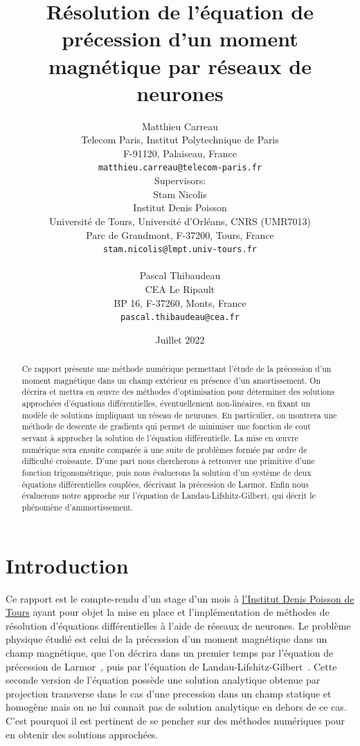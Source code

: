 \documentclass[12pt]{report}
\title{Résolution de l'équation de précession d'un moment magnétique par réseaux de neurones}
\author{
  Matthieu Carreau\\
  Telecom Paris, Institut Polytechnique de Paris\\
  F-91120, Palaiseau, France\\
  \texttt{matthieu.carreau@telecom-paris.fr} \\
  [1em] Supervisors: \\
  Stam Nicolis\\
  Institut Denis Poisson\\
  Université de Tours, Université d'Orléans, CNRS (UMR7013)\\
  Parc de Grandmont, F-37200, Tours, France\\
  \texttt{stam.nicolis@lmpt.univ-tours.fr}\\
  [1em] \\
  Pascal Thibaudeau\\
  CEA Le Ripault\\
  BP 16, F-37260, Monts, France\\
  \texttt{pascal.thibaudeau@cea.fr}
}
\date{Juillet 2022}
\begin{document}
\maketitle

\begin{abstract}
    Ce rapport présente une méthode numérique permettant l'étude de la préces\-sion d'un moment magnétique dans un champ extérieur en présence d'un amortissement.
    On décrira et mettra en {\oe}uvre des méthodes d'optimisation pour déterminer des solutions approchées d'équations différentielles, éventuellement non-linéaires, en fixant un modèle de solutions impliquant un réseau de neurones. 
    En particulier, on montrera une méthode de descente de gradients qui permet de minimiser une fonction de cout servant à approcher la solution de l'équation différentielle.
    La mise en {\oe}uvre numérique sera ensuite comparée à une suite de problèmes formée par ordre de difficulté croissante. 
    D'une part nous chercherons à retrouver une primitive d'une fonction trigonométrique, puis nous évaluerons la solution d'un système de deux équations différentielles couplées, décrivant la précession de Larmor.
    Enfin nous évaluerons notre approche sur l'équation de Landau-Lifshitz-Gilbert, qui décrit le phénomène d'ammortissement.
\end{abstract}
    
\tableofcontents{}

\chapter{Introduction}
\label{Introduction}

Ce rapport est le compte-rendu d'un stage d'un mois à \href{https://www.idpoisson.fr}{l'Institut Denis Poisson de Tours} ayant pour objet la mise en place et l'implémentation de méthodes de résolution d'équations différentielles à l'aide de réseaux de neurones. 
Le problème physique étudié est celui de la précession d'un moment magnétique dans un champ magnétique, que l'on décrira dans un premier temps par l'équation de précession de Larmor~\cite{PrecessionLarmor}, puis par l'équation de Landau-Lifshitz-Gilbert~\cite{EquationGilbert}.
Cette seconde version de l'équation possède une solution analytique obtenue par projection transverse dans le cas d'une precession dans un champ statique et homogène mais on ne lui connait pas de solution analytique en dehors de ce cas.
C'est pourquoi il est pertinent de se pencher sur des méthodes numériques pour en obtenir des solutions approchées.
\end{document}
